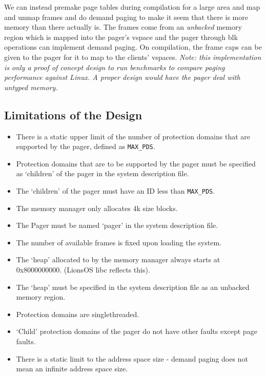 \documentclass{article}
\begin{document}
We can instead premake page tables during compilation for a large area and map and unmap frames and do demand paging to make it seem that there is more memory than there actually is. The frames come from an \textit{unbacked} memory region which is mapped into the pager's vspace and the pager through blk operations can implement demand paging. On compilation, the frame caps can be given to the pager for it to map to the clients' vspaces. \textit{Note: this implementation is only a proof of concept design to run benchmarks to compare paging performance against Linux. A proper design would have the pager deal with untyped memory.}
\subsection{Limitations of the Design}
\begin{itemize}
    \item There is a static upper limit of the number of protection domains that are supported by the pager, defined as \texttt{MAX\_PDS}.
    \item Protection domains that are to be supported by the pager must be specified as `children' of the pager in the system description file.
    \item The `children' of the pager must have an ID less than \texttt{MAX\_PDS}.
    \item The memory manager only allocates 4k size blocks.
    \item The Pager must be named `pager' in the system description file.
    \item The number of available frames is fixed upon loading the system.
    \item The `heap' allocated to by the memory manager always starts at 0x8000000000. (LionsOS libc reflects this).
    \item The `heap' must be specified in the system description file as an unbacked memory region. 
    \item Protection domains are singlethreaded.
    \item `Child' protection domains of the pager do not have other faults except page faults.
    \item There is a static limit to the address space size - demand paging does not mean an infinite address space size. 
\end{itemize} 
\end{document}
